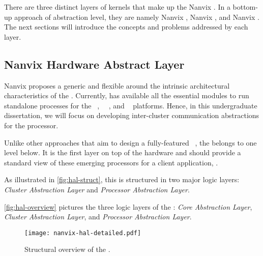 	There are three distinct layers of kernels that make up the Nanvix \os.
	In a bottom-up approach of abstraction level, they are namely Nanvix \hal,
	Nanvix \microkernel, and Nanvix \multikernel.
	The next sections will introduce the concepts and problems addressed by each layer.

	\subsection{Nanvix Hardware Abstract Layer}
	\label{sec.hal}


		Nanvix \os proposes a generic and flexible \hal around the
		intrinsic architectural characteristics of the \lightweight \manycores.
		Currently, \hal has available all the essential modules to run standalone
		processes for the \mppa~\cite{DeDinechin2013-1}, \optimsoc~~\cite{Wallentowitz2013},
		and \hero~\cite{Kurth2017} platforms.
		Hence, in this undergraduate dissertation, we will focus on developing
		inter-cluster communication abstractions for the \mppa processor.

		Unlike other approaches that aim to design a fully-featured \os~\cite{Baumann2009,kluge2014,nightingale2009,rhoden2011},
		the \hal belongs to one level below.
		It is the first layer on top of the hardware and should provide a standard
		view of these emerging processors for a client application, \eg \os.
		
		As illustrated in \autoref{fig:hal-struct}, this \hal is structured in
		two major logic layers: \textit{Cluster Abstraction Layer} and \textit{Processor Abstraction Layer}.

		\autoref{fig:hal-overview} pictures the three logic layers of the \hal:
		\textit{Core Abstraction Layer}, \textit{Cluster Abstraction Layer}, and \textit{Processor Abstraction Layer}.

		\begin{figure}[!tb]
			\centering%
			\caption{Structural overview of the \hal.}%
			\label{fig:hal-overview}%
			\texttt{[image: nanvix-hal-detailed.pdf]}%
		\end{figure}

